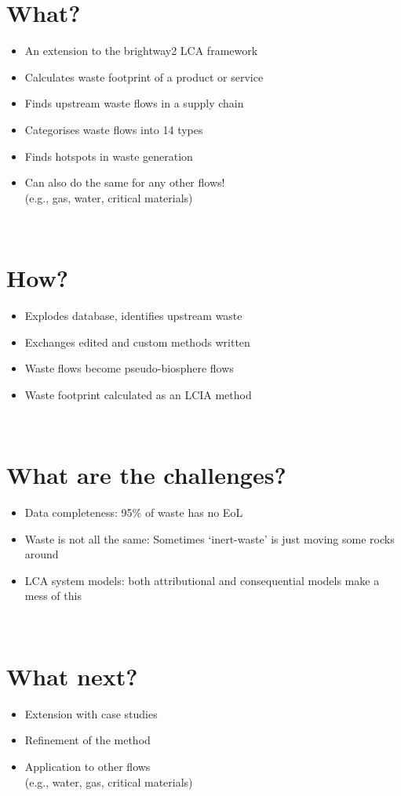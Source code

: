 \documentclass[a0paper,fleqn]{betterposter}
\begin{document}
{\section{What?}
\begin{itemize}
\item An extension to the brightway2 LCA framework
\item Calculates waste footprint of a product or service
\item Finds upstream waste flows in a supply chain
\item Categorises waste flows into 14 types
\item Finds hotspots in waste generation
\item Can also do the same for any other flows! \\(e.g., gas, water, critical materials)
\end{itemize}\\

\section{How?}
\begin{itemize}
    \item Explodes database, identifies upstream waste
    \item Exchanges edited and custom methods written
    \item Waste flows become pseudo-biosphere flows
    \item Waste footprint calculated as an LCIA method
\end{itemize}\\

\section{What are the challenges?}
\begin{itemize}
    \item Data completeness: 95\% of waste has no EoL
    \item Waste is not all the same: Sometimes `inert-waste' is just moving some rocks around
    \item LCA system models: both attributional and consequential models make a mess of this
\end{itemize}\\

\section{What next?}
\begin{itemize}
    \item Extension with case studies
    \item Refinement of the method
    \item Application to other flows \\
    (e.g., water, gas, critical materials)
\end{itemize}

}
\end{document}
